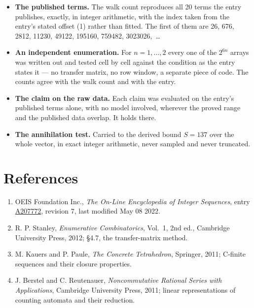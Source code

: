 \documentclass[11pt]{article}
\theoremstyle{definition}
\begin{document}
\begin{itemize}

\item {\bfseries The published terms.} The walk count reproduces all 20 terms the entry publishes, exactly, in integer arithmetic, with the index taken from the entry's stated offset (1) rather than fitted. The first of them are 26, 676, 2812, 11230, 49122, 195160, 759482, 3023026,~\dots

\item {\bfseries An independent enumeration.} For $n = 1,\dots,2$ every one of the $2^{6n}$ arrays was written out and tested cell by cell against the condition as the entry states it --- no transfer matrix, no row window, a separate piece of code. The counts agree with the walk count and with the entry.

\item {\bfseries The claim on the raw data.} Each claim was evaluated on the entry's published terms alone, with no model involved, wherever the proved range and the published data overlap. It holds there.

\item {\bfseries The annihilation test.} Carried to the derived bound $S = 137$ over the whole vector, in exact integer arithmetic, never sampled and never truncated.

\end{itemize}

\section{References}

\begin{enumerate}

\item OEIS Foundation Inc., \emph{The On-Line Encyclopedia of Integer Sequences}, entry \href{https://oeis.org/A207772}{A207772}, revision 7, last modified May 08 2022.

\item R. P. Stanley, \emph{Enumerative Combinatorics}, Vol.~1, 2nd ed., Cambridge University Press, 2012; \S4.7, the transfer-matrix method.

\item M. Kauers and P. Paule, \emph{The Concrete Tetrahedron}, Springer, 2011; C-finite sequences and their closure properties.

\item J. Berstel and C. Reutenauer, \emph{Noncommutative Rational Series with Applications}, Cambridge University Press, 2011; linear representations of counting automata and their reduction.

\end{enumerate}
\end{document}
